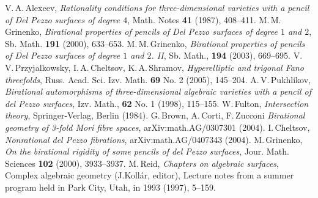 \documentclass[12pt]{amsart}
\theoremstyle{definition}
\theoremstyle{remark}
\begin{document}
V.\,A.\,Alexeev, \emph{Rationality conditions for three-dimensional varieties 
with a pencil of Del Pezzo surfaces of degree $4$}, Math. Notes \textbf{41} 
(1987), 408--411.%
M.\,M.\,Grinenko, \emph{Birational properties of pencils of Del Pezzo 
surfaces of degree $1$ and $2$}, Sb. Math. \textbf{191} (2000), 
633--653.%
M.\,M.\,Grinenko, \emph{Birational properties of pencils of Del Pezzo
surfaces of degree $1$ and $2$. II}, Sb. Math., \textbf{194} (2003), 669--695.%
V.\,V.\,Przyjalkowsky, I.\,A.\,Cheltsov, K.\,A.\,Shramov,
\emph{Hyperelliptic and trigonal Fano threefolds}, Russ. Acad. Sci. Izv. Math.
\textbf{69} No. 2 (2005), 145--204.%
A.\,V.\,Pukhlikov, \emph{Birational automorphisms of three-dimensional 
algebraic varieties with a pencil of del Pezzo surfaces}, 
Izv. Math., \textbf{62} No. 1 
(1998), 115--155.%
W.\,Fulton, \emph{Intersection theory}, Springer-Verlag, Berlin (1984).
G.\,Brown, A.\,Corti, F.\,Zucconi \emph{Birational geometry of
3-fold Mori fibre spaces},  arXiv:math.AG/0307301 (2004).
I.\,Cheltsov, \emph{Nonrational del Pezzo fibrations}, 
arXiv:math.AG/0407343 (2004).
M.\,Grinenko, \emph{On the birational rigidity of some pencils 
of del Pezzo surfaces}, Jour. Math. Sciences \textbf{102} (2000), 3933--3937.%
M.\,Reid, \emph{Chapters on algebraic surfaces}, Complex algebraic
geometry (J.Koll\'ar, editor), Lecture notes from a summer program
held in Park City, Utah, in 1993 (1997), 5--159.
\end{document}
